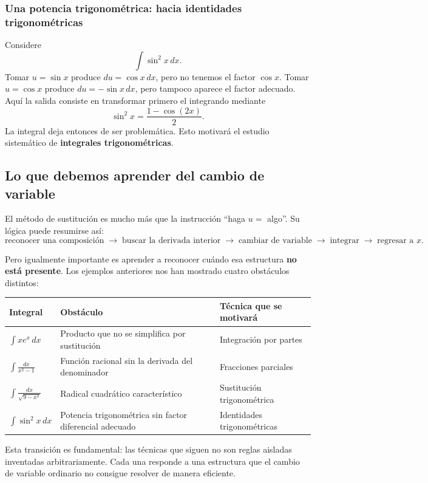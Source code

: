 \documentclass[12pt]{article}
\theoremstyle{definition}
\theoremstyle{remark}
\begin{document}
\subsubsection*{Una potencia trigonométrica: hacia identidades trigonométricas}

Considere
\[
\int\sin^2x\,dx.
\]
Tomar $u=\sin x$ produce $du=\cos x\,dx$, pero no tenemos el factor $\cos x$. Tomar $u=\cos x$ produce $du=-\sin x\,dx$, pero tampoco aparece el factor adecuado. Aquí la salida consiste en transformar primero el integrando mediante
\[
\sin^2x=\frac{1-\cos(2x)}2.
\]
La integral deja entonces de ser problemática. Esto motivará el estudio sistemático de \textbf{integrales trigonométricas}.

\subsection*{Lo que debemos aprender del cambio de variable}

El método de sustitución es mucho más que la instrucción ``haga $u=$ algo''. Su lógica puede resumirse así:
\[
\boxed{\text{reconocer una composición}\;\longrightarrow\;
\text{buscar la derivada interior}\;\longrightarrow\;
\text{cambiar de variable}\;\longrightarrow\;
\text{integrar}\;\longrightarrow\;
\text{regresar a }x.}
\]

Pero igualmente importante es aprender a reconocer cuándo esa estructura \textbf{no está presente}. Los ejemplos anteriores nos han mostrado cuatro obstáculos distintos:
\begin{center}
\begin{tabular}{p{}p{}p{}}
\toprule
\textbf{Integral} & \textbf{Obstáculo} & \textbf{Técnica que se motivará}\\
\midrule
$\int xe^x\,dx$ & Producto que no se simplifica por sustitución & Integración por partes\\
$\int\frac{dx}{x^2-1}$ & Función racional sin la derivada del denominador & Fracciones parciales\\
$\int\frac{dx}{\sqrt{9-x^2}}$ & Radical cuadrático característico & Sustitución trigonométrica\\
$\int\sin^2x\,dx$ & Potencia trigonométrica sin factor diferencial adecuado & Identidades trigonométricas\\
\bottomrule
\end{tabular}
\end{center}

Esta transición es fundamental: las técnicas que siguen no son reglas aisladas inventadas arbitrariamente. Cada una responde a una estructura que el cambio de variable ordinario no consigue resolver de manera eficiente.
\end{document}
